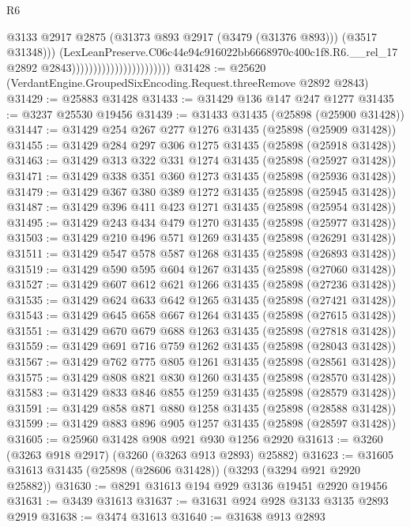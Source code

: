 \begin{lexlean}{R6}
\begin{coremodule}
                                                    @3133
                                                    @2917
                                                    @2875
                                                    (@31373 @893 @2917 (@3479 (@31376 @893)))
                                                    (@3517 @31348)))
                                                (LexLeanPreserve.C06c44e94c916022bb6668970c400c1f8.R6.__rel_17
                                                  @2892
                                                  @2843)))))))))))))))))))))))
@31428 := @25620 (VerdantEngine.GroupedSixEncoding.Request.threeRemove @2892 @2843)
@31429 := @25883 @31428
@31433 := @31429 @136 @147 @247 @1277
@31435 := @3237 @25530 @19456
@31439 := @31433 @31435 (@25898 (@25900 @31428))
@31447 := @31429 @254 @267 @277 @1276 @31435 (@25898 (@25909 @31428))
@31455 := @31429 @284 @297 @306 @1275 @31435 (@25898 (@25918 @31428))
@31463 := @31429 @313 @322 @331 @1274 @31435 (@25898 (@25927 @31428))
@31471 := @31429 @338 @351 @360 @1273 @31435 (@25898 (@25936 @31428))
@31479 := @31429 @367 @380 @389 @1272 @31435 (@25898 (@25945 @31428))
@31487 := @31429 @396 @411 @423 @1271 @31435 (@25898 (@25954 @31428))
@31495 := @31429 @243 @434 @479 @1270 @31435 (@25898 (@25977 @31428))
@31503 := @31429 @210 @496 @571 @1269 @31435 (@25898 (@26291 @31428))
@31511 := @31429 @547 @578 @587 @1268 @31435 (@25898 (@26893 @31428))
@31519 := @31429 @590 @595 @604 @1267 @31435 (@25898 (@27060 @31428))
@31527 := @31429 @607 @612 @621 @1266 @31435 (@25898 (@27236 @31428))
@31535 := @31429 @624 @633 @642 @1265 @31435 (@25898 (@27421 @31428))
@31543 := @31429 @645 @658 @667 @1264 @31435 (@25898 (@27615 @31428))
@31551 := @31429 @670 @679 @688 @1263 @31435 (@25898 (@27818 @31428))
@31559 := @31429 @691 @716 @759 @1262 @31435 (@25898 (@28043 @31428))
@31567 := @31429 @762 @775 @805 @1261 @31435 (@25898 (@28561 @31428))
@31575 := @31429 @808 @821 @830 @1260 @31435 (@25898 (@28570 @31428))
@31583 := @31429 @833 @846 @855 @1259 @31435 (@25898 (@28579 @31428))
@31591 := @31429 @858 @871 @880 @1258 @31435 (@25898 (@28588 @31428))
@31599 := @31429 @883 @896 @905 @1257 @31435 (@25898 (@28597 @31428))
@31605 := @25960 @31428 @908 @921 @930 @1256 @2920
@31613 := @3260 (@3263 @918 @2917) (@3260 (@3263 @913 @2893) @25882)
@31623 := @31605 @31613 @31435 (@25898 (@28606 @31428)) (@3293 (@3294 @921 @2920 @25882))
@31630 := @8291 @31613 @194 @929 @3136 @19451 @2920 @19456
@31631 := @3439 @31613
@31637 := @31631 @924 @928 @3133 @3135 @2893 @2919
@31638 := @3474 @31613
@31640 := @31638 @913 @2893

\end{coremodule}
\end{lexlean}
